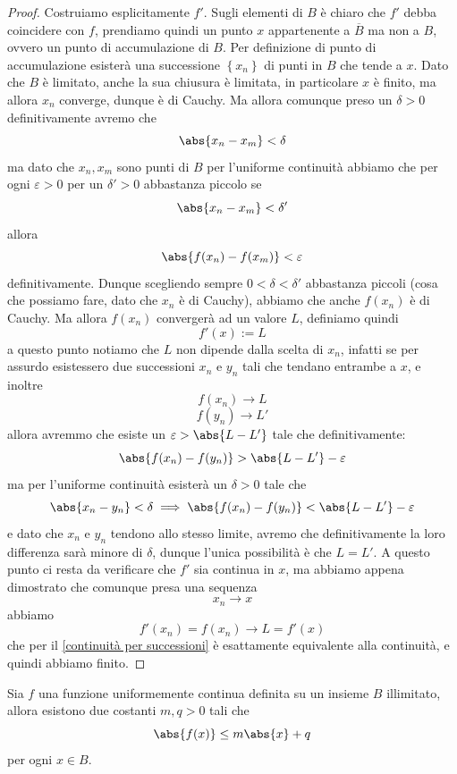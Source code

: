\documentclass[11pt]{scrartcl}
\begin{document}
	\begin{proof}
		Costruiamo esplicitamente $f'$. Sugli elementi di $B$ è chiaro che $f'$ debba coincidere con $f$, prendiamo quindi un punto $x$ appartenente a $\overline{B}$ ma non a $B$, ovvero un punto di accumulazione di $B$. Per definizione di punto di accumulazione esisterà una successione $\left\{x_n\right\}$ di punti in $B$ che tende a $x$. Dato che $B$ è limitato, anche la sua chiusura è limitata, in particolare $x$ è finito, ma allora $x_n$ converge, dunque è di Cauchy. Ma allora comunque preso un $\delta>0$ definitivamente avremo che 
		$$\abs{x_n-x_m}<\delta$$
		ma dato che $x_n,x_m$ sono punti di $B$ per l'uniforme continuità abbiamo che per ogni $\varepsilon>0$ per un $\delta'>0$ abbastanza piccolo se 
		$$\abs{x_n-x_m}<\delta'$$
		allora 
		$$\abs{f(x_n)-f(x_m)}<\varepsilon$$
		definitivamente. Dunque scegliendo sempre $0<\delta<\delta'$ abbastanza piccoli (cosa che possiamo fare, dato che $x_n$ è di Cauchy), abbiamo che anche $f(x_n)$ è di Cauchy. Ma allora $f(x_n)$ convergerà ad un valore $L$, definiamo quindi
		$$f'(x):=L$$
		a questo punto notiamo che $L$ non dipende dalla scelta di $x_n$, infatti se per assurdo esistessero due successioni $x_n$ e $y_n$ tali che tendano entrambe a $x$, e inoltre
		$$f(x_n)\to L$$
		$$f(y_n)\to L'$$
		allora avremmo che esiste un $\varepsilon>\abs{L-L'}$ tale che definitivamente:
		$$\abs{f(x_n)-f(y_n)}>\abs{L-L'}-\varepsilon$$
		ma per l'uniforme continuità esisterà un $\delta>0$ tale che
		$$\abs{x_n-y_n}<\delta \implies \abs{f(x_n)-f(y_n)}<\abs{L-L'}-\varepsilon$$
		e dato che $x_n$ e $y_n$ tendono allo stesso limite, avremo che definitivamente la loro differenza sarà minore di $\delta$, dunque l'unica possibilità è che $L=L'$. A questo punto ci resta da verificare che $f'$ sia continua in $x$, ma abbiamo appena dimostrato che comunque presa una sequenza
		$$x_n\to x$$
		abbiamo
		$$f'(x_n)=f(x_n)\to L = f'(x)$$
		che per il \ref{continuità per successioni} è esattamente equivalente alla continuità, e quindi abbiamo finito.
	\end{proof}
	\begin{theorem}
		Sia $f$ una funzione uniformemente continua definita su un insieme $B$ illimitato, allora esistono due costanti $m,q>0$ tali che
		$$\abs{f(x)}\le m\abs{x}+q$$
		per ogni $x\in B$.
	\end{theorem}
\end{document}
